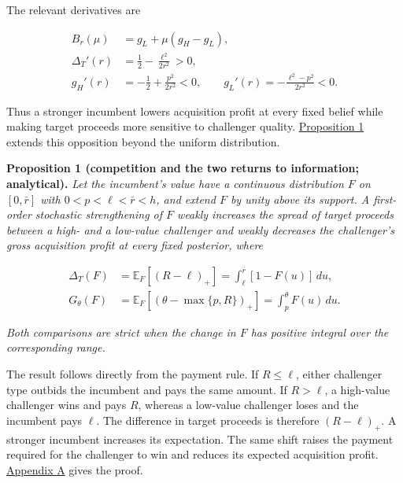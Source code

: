 \documentclass[
  12pt,
]{article}
\begin{document}
The relevant derivatives are

\[
\begin{aligned}
B_r(\mu)&=g_L+\mu(g_H-g_L),\\
\Delta_T'(r)&=\frac12-\frac{\ell^2}{2r^2}>0,\\
g_H'(r)&=-\frac12+\frac{p^2}{2r^2}<0,
\qquad g_L'(r)=-\frac{\ell^2-p^2}{2r^2}<0.
\end{aligned}
\tag{5}\label{eq:paper-5}
\]

Thus a stronger incumbent lowers acquisition profit at every fixed
belief while making target proceeds more sensitive to challenger
quality. \hyperref[result-proposition-1]{Proposition 1} extends this
opposition beyond the uniform distribution.


\protect{}\label{result-proposition-1}{\textbf{Proposition
1 (competition and the two returns to information; analytical).}}
\emph{Let the incumbent's value have a continuous distribution \(F\) on
\([0,\bar r]\) with \(0<p<\ell<\bar r<h\), and extend \(F\) by unity
above its support. A first-order stochastic strengthening of \(F\)
weakly increases the spread of target proceeds between a high- and a
low-value challenger and weakly decreases the challenger's gross
acquisition profit at every fixed posterior, where}

\[
\begin{aligned}
\Delta_T(F)&=\mathbb E_F[(R-\ell)_+]
=\int_\ell^{\bar r}[1-F(u)]\,du,\\
G_\theta(F)&=\mathbb E_F[(\theta-\max\{p,R\})_+]
=\int_p^\theta F(u)\,du.
\end{aligned}
\tag{6}\label{eq:paper-6}
\]

\emph{Both comparisons are strict when the change in \(F\) has positive
integral over the corresponding range.}

The result follows directly from the payment rule. If \(R\le\ell\),
either challenger type outbids the incumbent and pays the same amount.
If \(R>\ell\), a high-value challenger wins and pays \(R\), whereas a
low-value challenger loses and the incumbent pays \(\ell\). The
difference in target proceeds is therefore \((R-\ell)_+\). A stronger
incumbent increases its expectation. The same shift raises the payment
required for the challenger to win and reduces its expected acquisition
profit. \hyperref[paper-appendix]{Appendix A} gives the proof.
\end{document}
